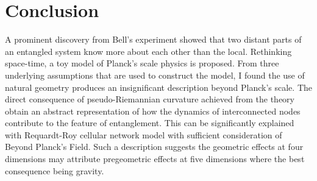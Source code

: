 \documentclass{article}
\begin{document}
\section{Conclusion}
A prominent discovery from Bell's experiment showed that two distant parts of an entangled system know more about each other than the local. Rethinking space-time, a toy model of Planck's scale physics is proposed. From three underlying assumptions that are used to construct the model, I found the use of natural geometry produces an insignificant description beyond Planck's scale. The direct consequence of pseudo-Riemannian curvature achieved from the theory obtain an abstract representation of how the dynamics of interconnected nodes contribute to the feature of entanglement. This can be significantly explained with Requardt-Roy cellular network model with sufficient consideration of Beyond Planck's Field. Such a description suggests the geometric effects at four dimensions may attribute pregeometric effects at five dimensions where the best consequence being gravity.
\end{document}
